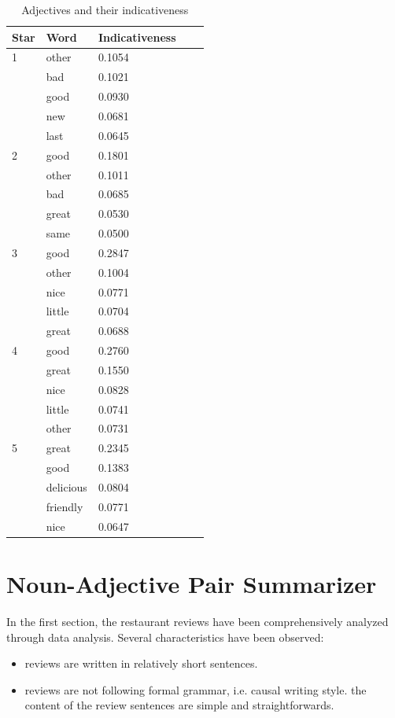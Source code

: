 \documentclass[sigconf]{acmart}
\begin{document}
\begin{table}
  \caption{Adjectives and their indicativeness}
  \label{tab:adj2}
  \begin{tabular}{lllll}
    \toprule
    Star & Word & Indicativeness \\
    \midrule
    1 & other & 0.1054\\ 
    & bad & 0.1021\\ 
    & good & 0.0930\\ 
    & new & 0.0681\\ 
    & last & 0.0645\\
    2 & good & 0.1801\\ 
    & other & 0.1011\\ 
    & bad & 0.0685\\ 
    & great & 0.0530\\ 
    & same & 0.0500\\
    3 & good & 0.2847\\ 
    & other & 0.1004\\ 
    & nice & 0.0771\\ 
    & little & 0.0704\\ 
    & great & 0.0688\\
    4 & good & 0.2760\\ 
    & great & 0.1550\\ 
    & nice & 0.0828\\ 
    & little & 0.0741\\ 
    & other & 0.0731\\
    5 & great & 0.2345\\ 
    & good & 0.1383\\ 
    & delicious & 0.0804\\
    & friendly & 0.0771\\ 
    & nice & 0.0647\\
\end{tabular}
\end{table}


\section{Noun-Adjective Pair Summarizer}

In the first section, the restaurant reviews have been comprehensively analyzed through data analysis. Several characteristics have been observed: 
\begin{itemize}
\item reviews are written in relatively short sentences.
\item reviews are not following formal grammar, i.e. causal writing style.
\itme the content of the review sentences are simple and straightforwards.
\end{itemize}
\end{document}
